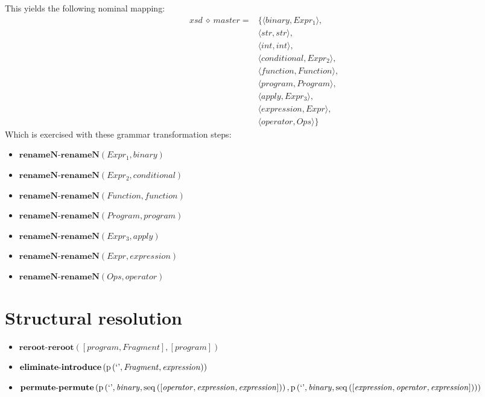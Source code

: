 This yields the following nominal mapping:
\begin{align*}\mathit{xsd} \:\diamond\: \mathit{master} =& \{\langle \mathit{binary},\mathit{Expr_1}\rangle,\\
 & \langle str,str\rangle,\\
 & \langle int,int\rangle,\\
 & \langle \mathit{conditional},\mathit{Expr_2}\rangle,\\
 & \langle \mathit{function},\mathit{Function}\rangle,\\
 & \langle \mathit{program},\mathit{Program}\rangle,\\
 & \langle \mathit{apply},\mathit{Expr_3}\rangle,\\
 & \langle \mathit{expression},\mathit{Expr}\rangle,\\
 & \langle \mathit{operator},\mathit{Ops}\rangle\}\end{align*}
 Which is exercised with these grammar transformation steps:

{\footnotesize\begin{itemize}
\item $\mathbf{renameN\text{-}renameN}\left(\mathit{Expr_1},\mathit{binary}\right)$
\item $\mathbf{renameN\text{-}renameN}\left(\mathit{Expr_2},\mathit{conditional}\right)$
\item $\mathbf{renameN\text{-}renameN}\left(\mathit{Function},\mathit{function}\right)$
\item $\mathbf{renameN\text{-}renameN}\left(\mathit{Program},\mathit{program}\right)$
\item $\mathbf{renameN\text{-}renameN}\left(\mathit{Expr_3},\mathit{apply}\right)$
\item $\mathbf{renameN\text{-}renameN}\left(\mathit{Expr},\mathit{expression}\right)$
\item $\mathbf{renameN\text{-}renameN}\left(\mathit{Ops},\mathit{operator}\right)$
\end{itemize}}

\section{Structural resolution}
{\footnotesize\begin{itemize}
\item $\mathbf{reroot\text{-}reroot}\left([\mathit{program}, \mathit{Fragment}],[\mathit{program}]\right)$
\item $\mathbf{eliminate\text{-}introduce}\\\left(\mathrm{p}\left(\text{`'},\mathit{Fragment},\mathit{expression}\right)\right)$
\item $\mathbf{permute\text{-}permute}\\\left(\mathrm{p}\left(\text{`'},\mathit{binary},\mathrm{seq}\left(\left[\mathit{operator}, \mathit{expression}, \mathit{expression}\right]\right)\right),\\\mathrm{p}\left(\text{`'},\mathit{binary},\mathrm{seq}\left(\left[\mathit{expression}, \mathit{operator}, \mathit{expression}\right]\right)\right)\right)$
\end{itemize}}
